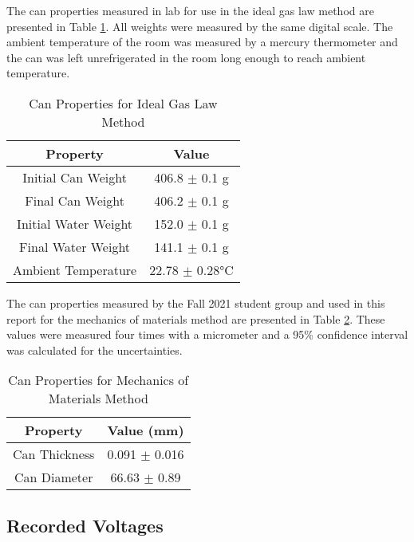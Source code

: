 \documentclass[10pt,journal,letterpaper]{IEEEtran}
\begin{document}
The can properties measured in lab for use in the ideal gas law method are presented in Table \ref{tab:IGLProp}.
All weights were measured by the same digital scale.
The ambient temperature of the room was measured by a mercury thermometer and the can was left unrefrigerated in the room long enough to reach ambient temperature.
\begin{table}[H]
\renewcommand\arraystretch{1.25}
\centering
\caption{Can Properties for Ideal Gas Law Method}
\begin{tabular}{cc}
\hline \hline
Property & Value \\
\hline
Initial Can Weight & 406.8 $\pm$ 0.1 g \\
Final Can Weight & 406.2 $\pm$ 0.1 g \\
Initial Water Weight & 152.0 $\pm$ 0.1 g \\
Final Water Weight & 141.1 $\pm$ 0.1 g \\
Ambient Temperature & 22.78 $\pm$ 0.28\unit{\celsius} \\
\hline \hline
\end{tabular}
\label{tab:IGLProp}
\end{table}

The can properties measured by the Fall 2021 student group and used in this report for the mechanics of materials method are presented in Table \ref{tab:MoMProp}.
These values were measured four times with a micrometer and a 95\% confidence interval was calculated for the uncertainties.
\begin{table}[H]
\renewcommand\arraystretch{1.25}
\centering
\caption{Can Properties for Mechanics of Materials Method}
\begin{tabular}{cc}
\hline \hline
Property & Value (mm) \\
\hline
Can Thickness & 0.091 $\pm$ 0.016 \\
Can Diameter & 66.63 $\pm$ 0.89 \\
\hline \hline
\end{tabular}
\label{tab:MoMProp}
\end{table}

\subsection{Recorded Voltages}
\end{document}
